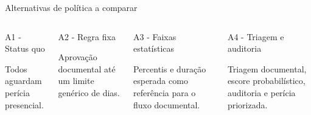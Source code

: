 \documentclass[presentation,aspectratio=169]{beamer}
\begin{document}
\begin{frame}[t]{Alternativas de política a comparar}
\begin{columns}[T,onlytextwidth]
\begin{block}{A1 - Status quo}
\begin{minipage}[t][0.86cm][t]{\linewidth}\raggedright\small
Todos aguardam perícia presencial.
\end{minipage}
\end{block}
\vspace{0.24cm}
\begin{block}{A2 - Regra fixa}
\begin{minipage}[t][0.86cm][t]{\linewidth}\raggedright\small
Aprovação documental até um limite genérico de dias.
\end{minipage}
\end{block}
\begin{block}{A3 - Faixas estatísticas}
\begin{minipage}[t][0.86cm][t]{\linewidth}\raggedright\small
Percentis e duração esperada como referência para o fluxo documental.
\end{minipage}
\end{block}
\vspace{0.24cm}
\begin{block}{A4 - Triagem e auditoria}
\begin{minipage}[t][0.86cm][t]{\linewidth}\raggedright\small
Triagem documental, escore probabilístico, auditoria e perícia priorizada.
\end{minipage}
\end{block}
\end{columns}
\vspace{0.26cm}
\end{frame}
\end{document}
